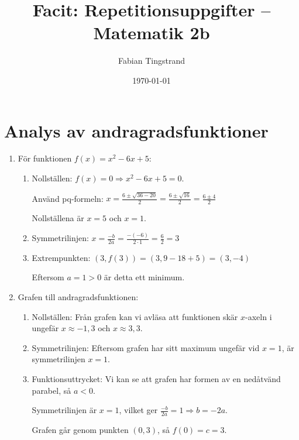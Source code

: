 \documentclass[a4paper,11pt]{article}
\title{Facit: Repetitionsuppgifter -- Matematik 2b}
\author{Fabian Tingstrand}
\date{\today}
\begin{document}
\maketitle

\section{Analys av andragradsfunktioner}

\begin{enumerate}[label=\textbf{\arabic*.}]
    \item För funktionen $f(x) = x^2 - 6x + 5$:
    \begin{enumerate}[label=\alph*)]
        \item Nollställen: $f(x) = 0 \Rightarrow x^2 - 6x + 5 = 0$. 
        
        Använd pq-formeln: $x = \frac{6 \pm \sqrt{36-20}}{2} = \frac{6 \pm \sqrt{16}}{2} = \frac{6 \pm 4}{2}$
        
        Nollställena är $x = 5$ och $x = 1$.
        
        \item Symmetrilinjen: $x = \frac{-b}{2a} = \frac{-(-6)}{2 \cdot 1} = \frac{6}{2} = 3$
        
        \item Extrempunkten: $(3, f(3)) = (3, 9 - 18 + 5) = (3, -4)$
        
        Eftersom $a = 1 > 0$ är detta ett minimum.
    \end{enumerate}
    
    \item Grafen till andragradsfunktionen:
    \begin{enumerate}[label=\alph*)]
        \item Nollställen: Från grafen kan vi avläsa att funktionen skär $x$-axeln i ungefär $x \approx -1,3$ och $x \approx 3,3$.
        
        \item Symmetrilinjen: Eftersom grafen har sitt maximum ungefär vid $x = 1$, är symmetrilinjen $x = 1$.
        
        \item Funktionsuttrycket: Vi kan se att grafen har formen av en nedåtvänd parabel, så $a < 0$. 
        
        Symmetrilinjen är $x = 1$, vilket ger $\frac{-b}{2a} = 1 \Rightarrow b = -2a$.
        
        Grafen går genom punkten $(0, 3)$, så $f(0) = c = 3$.
        

\end{enumerate}
\end{enumerate}
\end{document}
